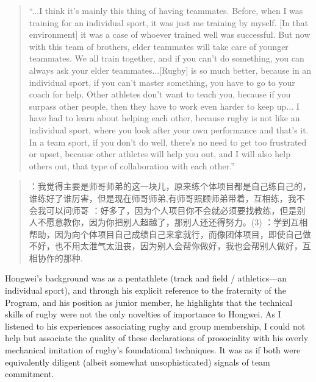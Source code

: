 \begin{quotation}
  ``...I think it's mainly this thing of having teammates. Before, when I was training for an individual sport, it was just me training by myself. [In that environment] it was a case of whoever trained well was successful.  But now with this team of brothers, elder teammates will take care of younger teammates. We all train together, and if you can’t do something, you can always ask your elder teammates...[Rugby] is so much better, because in an individual sport, if you can't master something, you have to go to your coach for help. Other athletes don't want to teach you, because if you surpass other people, then they have to work even harder to keep up... I have had to learn about helping each other, because rugby is not like an individual sport, where you look after your own performance and that's it.  In a team sport, if you don't do well, there's no need to get too frustrated or upset, because other athletes will help you out, and I will also help others out, that type of collaboration with each other.''
\end{quotation}

\begin{CJK}{UTF8}{gbsn}
  \begin{quotation}
    ：我觉得主要是师哥师弟的这一块儿，原来练个体项目都是自己练自己的，谁练好了谁厉害，但是现在师哥师弟,有师哥照顾师弟带着，互相练，我不会我可以问师哥
    ：好多了，因为个人项目你不会就必须要找教练，但是别人不愿意教你，因为你把别人超越了，那别人还还得努力。(3) ：学到互相帮助，因为向个体项目自己成绩自己来拿就行，而像团体项目，即使自己做不好，也不用太泄气太沮丧，因为别人会帮你做好，我也会帮别人做好，互相协作的那种.
  \end{quotation}
\end{CJK}

Hongwei’s background was as a pentathlete (track and field / athletics---an individual sport), and through his explicit reference to the fraternity of the Program, and his position as junior member, he highlights that the technical skills of rugby were not the only novelties of importance to Hongwei. As I listened to his experiences associating rugby and group membership, I could not help but associate the quality of these declarations of prosociality with his overly mechanical imitation of rugby's foundational techniques.  It was as if both were equivalently diligent (albeit somewhat unsophisticated) signals of team commitment.

